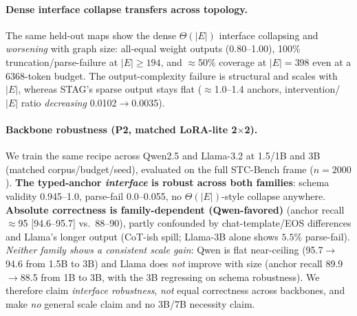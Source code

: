 \paragraph{Dense interface collapse transfers across topology.}
The same held-out maps show the dense $\Theta(|E|)$ interface collapsing and \emph{worsening} with graph
size: all-equal weight outputs (0.80--1.00), 100\% truncation/parse-failure at $|E|\ge 194$, and
$\approx$50\% coverage at $|E|{=}398$ even at a 6368-token budget. The output-complexity failure is
structural and scales with $|E|$, whereas STAG's sparse output stays flat ($\approx$1.0--1.4 anchors,
intervention/$|E|$ ratio \emph{decreasing} 0.0102$\to$0.0035).

\paragraph{Backbone robustness (P2, matched LoRA-lite 2$\times$2).}
We train the same recipe across Qwen2.5 and Llama-3.2 at 1.5/1B and 3B (matched corpus/budget/seed),
evaluated on the full STC-Bench frame ($n{=}2000$). \textbf{The typed-anchor \emph{interface} is robust
across both families}: schema validity 0.945--1.0, parse-fail 0.0--0.055, no $\Theta(|E|)$-style collapse
anywhere. \textbf{Absolute correctness is family-dependent (Qwen-favored)} (anchor recall $\approx$95
[94.6--95.7] vs.\ 88--90), partly confounded by chat-template/EOS differences and Llama's longer output
(CoT-ish spill; Llama-3B alone shows $5.5\%$ parse-fail). \emph{Neither family shows a consistent scale
gain}: Qwen is flat near-ceiling (95.7$\to$94.6 from 1.5B to 3B) and Llama does \emph{not} improve with
size (anchor recall 89.9$\to$88.5 from 1B to 3B, with the 3B regressing on schema robustness). We
therefore claim \emph{interface robustness}, \emph{not} equal correctness across backbones, and make
\emph{no} general scale claim and no 3B/7B necessity claim.
